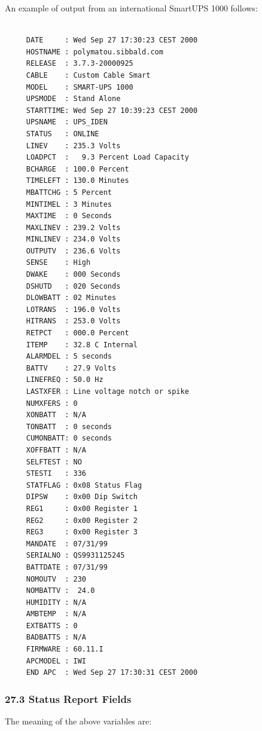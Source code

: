 \label{index-Examples_002c-Status-Report-254}
\label{index-Status-255}
An example of output from an international SmartUPS 1000 follows: 

\footnotesize
\begin{verbatim}
     
     DATE     : Wed Sep 27 17:30:23 CEST 2000
     HOSTNAME : polymatou.sibbald.com
     RELEASE  : 3.7.3-20000925
     CABLE    : Custom Cable Smart
     MODEL    : SMART-UPS 1000
     UPSMODE  : Stand Alone
     STARTTIME: Wed Sep 27 10:39:23 CEST 2000
     UPSNAME  : UPS_IDEN
     STATUS   : ONLINE
     LINEV    : 235.3 Volts
     LOADPCT  :   9.3 Percent Load Capacity
     BCHARGE  : 100.0 Percent
     TIMELEFT : 130.0 Minutes
     MBATTCHG : 5 Percent
     MINTIMEL : 3 Minutes
     MAXTIME  : 0 Seconds
     MAXLINEV : 239.2 Volts
     MINLINEV : 234.0 Volts
     OUTPUTV  : 236.6 Volts
     SENSE    : High
     DWAKE    : 000 Seconds
     DSHUTD   : 020 Seconds
     DLOWBATT : 02 Minutes
     LOTRANS  : 196.0 Volts
     HITRANS  : 253.0 Volts
     RETPCT   : 000.0 Percent
     ITEMP    : 32.8 C Internal
     ALARMDEL : 5 seconds
     BATTV    : 27.9 Volts
     LINEFREQ : 50.0 Hz
     LASTXFER : Line voltage notch or spike
     NUMXFERS : 0
     XONBATT  : N/A
     TONBATT  : 0 seconds
     CUMONBATT: 0 seconds
     XOFFBATT : N/A
     SELFTEST : NO
     STESTI   : 336
     STATFLAG : 0x08 Status Flag
     DIPSW    : 0x00 Dip Switch
     REG1     : 0x00 Register 1
     REG2     : 0x00 Register 2
     REG3     : 0x00 Register 3
     MANDATE  : 07/31/99
     SERIALNO : QS9931125245
     BATTDATE : 07/31/99
     NOMOUTV  : 230
     NOMBATTV :  24.0
     HUMIDITY : N/A
     AMBTEMP  : N/A
     EXTBATTS : 0
     BADBATTS : N/A
     FIRMWARE : 60.11.I
     APCMODEL : IWI
     END APC  : Wed Sep 27 17:30:31 CEST 2000
\end{verbatim}
\normalsize

\label{Status-Report-Fields}

\subsubsection*{27.3 Status Report Fields}

\label{index-Status-256}
The meaning of the above variables are:  

